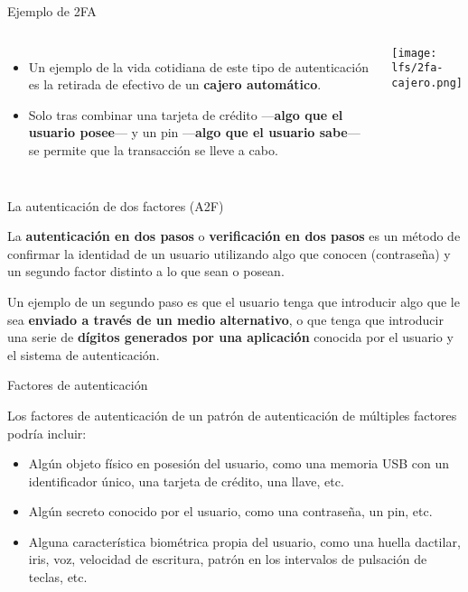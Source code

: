 \begin{frame}[c]{Ejemplo de 2FA}
    \begin{columns}
        \begin{itemize}
          \item Un ejemplo de la vida cotidiana de este tipo de
            autenticación es la retirada de efectivo de un \textbf{cajero
            automático}.
          \pausa
          \item Solo tras combinar una tarjeta de crédito —\textbf{algo que
            el usuario posee}— y un pin —\textbf{algo que el usuario sabe}—
            se permite que la transacción se lleve a cabo.
        \end{itemize}
        \begin{center}
            \texttt{[image: lfs/2fa-cajero.png]}
        \end{center}
    \end{columns}
\end{frame}

\begin{frame}[c]{La autenticación de dos factores (A2F)}
  \begin{block}{}
      La \textbf{autenticación en dos pasos} o \textbf{verificación en
      dos pasos} es un método de confirmar la identidad de un usuario
      utilizando algo que conocen (contraseña) y un segundo factor distinto
      a lo que sean o posean.
  \end{block}

  \pausa
  \vspace{\baselineskip}
  Un ejemplo de un segundo paso es que el usuario tenga que introducir algo
  que le sea \textbf{enviado a través de un medio alternativo},
  o que tenga que introducir una serie de \textbf{dígitos generados por una
  aplicación} conocida por el usuario y el sistema de autenticación. 
\end{frame}

\begin{frame}[c]{Factores de autenticación}

  Los factores de autenticación de un patrón de autenticación de
  múltiples factores podría incluir:

  \vspace{\baselineskip}
  \begin{itemize}
    \item Algún objeto físico en posesión del usuario, como una memoria
      USB con un identificador único, una tarjeta de crédito, una llave, etc.

    \pausa
    \item Algún secreto conocido por el usuario, como una contraseña,
      un pin, etc.

    \pausa
    \item Alguna característica biométrica propia del usuario, como una
      huella dactilar, iris, voz, velocidad de escritura, patrón en los
      intervalos de pulsación de teclas, etc.
  \end{itemize}
\end{frame}

